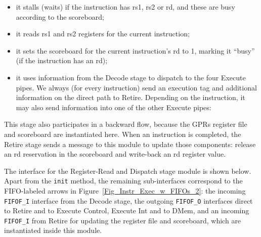 \begin{itemize}

  \item it stalls (waits) if the instruction has rs1, rs2 or rd, and
        these are busy according to the scoreboard;

  \item it reads rs1 and rs2 registers for the current instruction;

  \item it sets the scoreboard for the current instruction's rd to 1,
        marking it ``busy'' (if the instruction has an rd);

  \item it uses information from the Decode stage to dispatch to the
        four Execute pipes.  We always (for every instruction) send an
        execution tag and additional information on the direct path to
        Retire.  Depending on the instruction, it may also send
        information into one of the other Execute pipes:


\end{itemize}

This stage also participates in a backward flow, because the GPRs
register file and scoreboard are instantiated here.  When an
instruction is completed, the Retire stage sends a message to this
module to update those components: release an rd reservation in the
scoreboard and write-back an rd register value.

The interface for the Register-Read and Dispatch stage module is shown
below.  Apart from the \verb|init| method, the remaining
sub-interfaces correspond to the FIFO-labeled arrows in
Figure~\ref{Fig_Instr_Exec_w_FIFOs_2}: the incoming \verb|FIFOF_I|
interface from the Decode stage, the outgoing \verb|FIFOF_O|
interfaces direct to Retire and to Execute Control, Execute Int and to
DMem, and an incoming \verb|FIFOF_I| from Retire for updating the
register file and scoreboard, which are instantiated inside this
module.



